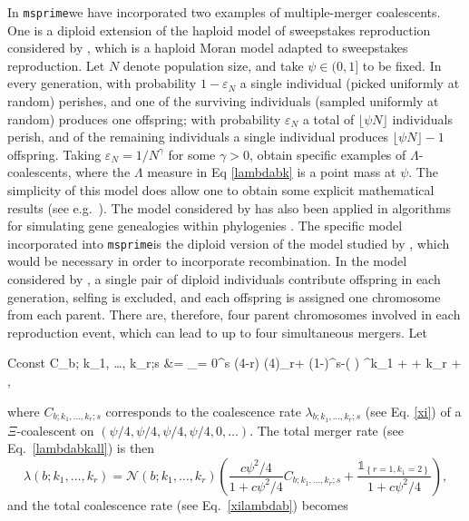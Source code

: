\documentclass{article}
\newcommand{\msprime}[0]{\texttt{msprime}}
\newcommand{\be}{\begin{equation}}
\newcommand{\ee}{\end{equation}}
\newcommand{\one}[1]{\ensuremath{\mathds{1}_{\left\{ #1 \right\}}}}%
\begin{document}
In \msprime we have incorporated two examples of multiple-merger
coalescents.  One is a diploid extension \citep{BBE13} of the haploid
model of sweepstakes reproduction considered by \cite{EW06}, which is
a haploid Moran model adapted to sweepstakes reproduction.  Let $N$
denote population size, and take $\psi \in (0,1]$ to be fixed.  In
every generation, with probability $1-\varepsilon_N$ a single
individual (picked uniformly at random) perishes, and one of the
surviving individuals (sampled uniformly at random) produces one
offspring; with probability $\varepsilon_N$ a total of
$\lfloor \psi N \rfloor$ individuals perish, and of the remaining
individuals a single individual produces $\lfloor \psi N \rfloor -1 $
offspring.  Taking $\varepsilon_N = 1/N^\gamma$ for some $\gamma > 0$,
\cite{EW06} obtain specific examples of $\Lambda$-coalescents, where
the $\Lambda$ measure in Eq \eqref{lambdabk} is a point mass at
$\psi$.  The simplicity of this model does allow one to obtain some
explicit mathematical results (see e.g.\
\cite{EF2018,Matuszewski2017,Der2012,Freund2020}). The model
considered by \cite{EW06} has also been applied in algorithms for
simulating gene genealogies within phylogenies \citep{Zhu2015}. The
 specific model incorporated into \msprime is the diploid version
\citep{BBE13} of the model studied by \cite{EW06}, which would be
necessary in order to incorporate recombination.  In the model
considered by \cite{BBE13}, a single pair of diploid individuals
contribute offspring in each generation, selfing is excluded, and each
offspring is assigned one chromosome from each parent. There are,
therefore, four parent chromosomes involved in each reproduction
event, which can lead to up to four simultaneous mergers.  Let
\begin{esplit}{Cconst}
C_{b; k_1, \ldots, k_r;s } &=   \sum_{\ell = 0}^{s \wedge (4-r)}  (4)_{r+\ell} (1-\psi)^{s-\ell }\left(  \right) ^{k_1 + \cdots + k_r + \ell},  \\
\end{esplit}
where  $C_{b; k_1, \ldots, k_r;s }$ corresponds to the coalescence rate $ \lambda_{b;k_1, \ldots, k_r;s}$ (see Eq. \eqref{xi}) of a  $\Xi$-coalescent on  $(\psi/4, \psi/4, \psi/4, \psi/4, 0, \ldots)$.
The total merger rate (see Eq.\ \eqref{lambdabkall}) is then 
\be\label{xidirlambdabk}
      \lambda(b;k_1, \ldots, k_r) =    \mathcal{N}(b; k_1, \ldots, k_r ) \left( \frac{c\psi^2/4}{1 +  c\psi^2/4}C_{b; k_1, \ldots, k_r;s } +     \frac{ \one{r=1, k_1 = 2} }{1 +  c\psi^2/4}  \right),
\ee
and the total coalescence rate (see Eq.\ \eqref{xilambdab}) becomes
\end{document}

